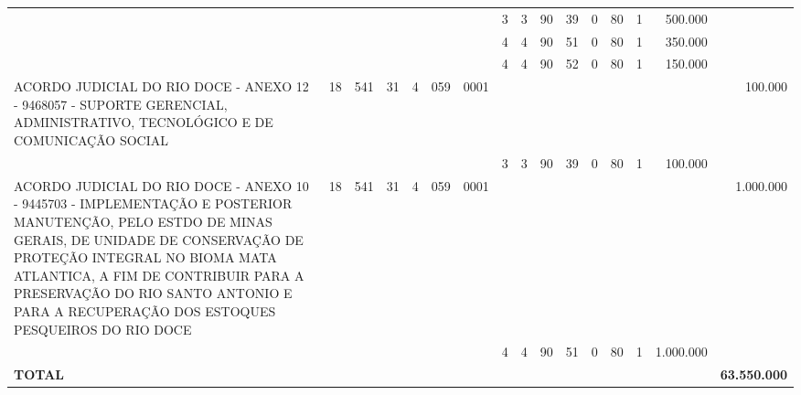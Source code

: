\documentclass{article}
\begin{document}
\begin{longtable}[c]{m{6.5cm}|m{1pt}m{1pt}m{1pt}m{1pt}m{1pt}m{1pt}|m{1pt}m{1pt}m{0.5pt}m{1pt}|m{1pt}|m{1pt}m{1pt}|m{1pt}|m{2pt}}
& & & & & & & \multicolumn{1}{c}{ 3 } & \multicolumn{1}{c}{ 3 } & \multicolumn{1}{c}{ 90 } & \multicolumn{1}{c|}{ 39 } & \multicolumn{1}{c|}{ 0 } & \multicolumn{1}{l}{ 80 } & \multicolumn{1}{c|}{ 1 } & \multicolumn{1}{r|}{ 500.000 } & \\
& & & & & & & \multicolumn{1}{c}{ 4 } & \multicolumn{1}{c}{ 4 } & \multicolumn{1}{c}{ 90 } & \multicolumn{1}{c|}{ 51 } & \multicolumn{1}{c|}{ 0 } & \multicolumn{1}{l}{ 80 } & \multicolumn{1}{c|}{ 1 } & \multicolumn{1}{r|}{ 350.000 } & \\
& & & & & & & \multicolumn{1}{c}{ 4 } & \multicolumn{1}{c}{ 4 } & \multicolumn{1}{c}{ 90 } & \multicolumn{1}{c|}{ 52 } & \multicolumn{1}{c|}{ 0 } & \multicolumn{1}{l}{ 80 } & \multicolumn{1}{c|}{ 1 } & \multicolumn{1}{r|}{ 150.000 } & \\
\multicolumn{1}{L{5.5cm}|}{ ACORDO JUDICIAL DO RIO DOCE - ANEXO 12 - 9468057 - SUPORTE GERENCIAL, ADMINISTRATIVO, TECNOLÓGICO E DE COMUNICAÇÃO SOCIAL } & \multicolumn{1}{c}{ 18 } & \multicolumn{1}{c}{ 541 } & \multicolumn{1}{c}{ 31 } & \multicolumn{1}{l}{ 4 } & \multicolumn{1}{c}{ 059 } & \multicolumn{1}{l|}{ 0001 } & & & & & & & & & \multicolumn{1}{r}{ 100.000 } \\
& & & & & & & \multicolumn{1}{c}{ 3 } & \multicolumn{1}{c}{ 3 } & \multicolumn{1}{c}{ 90 } & \multicolumn{1}{c|}{ 39 } & \multicolumn{1}{c|}{ 0 } & \multicolumn{1}{l}{ 80 } & \multicolumn{1}{c|}{ 1 } & \multicolumn{1}{r|}{ 100.000 } & \\
\multicolumn{1}{L{5.5cm}|}{ ACORDO JUDICIAL DO RIO DOCE - ANEXO 10 - 9445703 - IMPLEMENTAÇÃO E POSTERIOR MANUTENÇÃO, PELO ESTDO DE MINAS GERAIS, DE UNIDADE DE CONSERVAÇÃO DE PROTEÇÃO INTEGRAL NO BIOMA MATA ATLANTICA, A FIM DE CONTRIBUIR PARA A PRESERVAÇÃO DO RIO SANTO ANTONIO E PARA A RECUPERAÇÃO DOS ESTOQUES PESQUEIROS DO RIO DOCE } & \multicolumn{1}{c}{ 18 } & \multicolumn{1}{c}{ 541 } & \multicolumn{1}{c}{ 31 } & \multicolumn{1}{l}{ 4 } & \multicolumn{1}{c}{ 059 } & \multicolumn{1}{l|}{ 0001 } & & & & & & & & & \multicolumn{1}{r}{ 1.000.000 } \\
& & & & & & & \multicolumn{1}{c}{ 4 } & \multicolumn{1}{c}{ 4 } & \multicolumn{1}{c}{ 90 } & \multicolumn{1}{c|}{ 51 } & \multicolumn{1}{c|}{ 0 } & \multicolumn{1}{l}{ 80 } & \multicolumn{1}{c|}{ 1 } & \multicolumn{1}{r|}{ 1.000.000 } & \\
\hline
\multicolumn{15}{C{6cm}|}{\textbf{ TOTAL }} & \multicolumn{1}{r}{\textbf{ 63.550.000 }} \\
\end{longtable}
\newpage
{}
\end{document}
